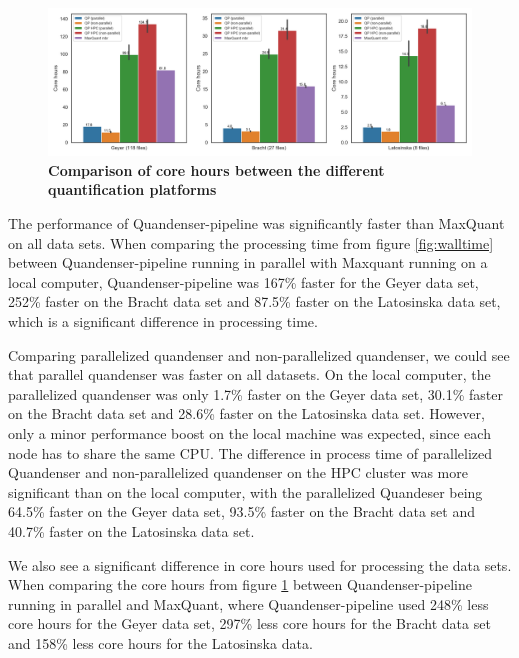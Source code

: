 \documentclass[11pt]{article}
\begin{document}
\begin{figure}[H]
  \includegraphics[width=\linewidth]{data/cores.png}
  \caption{\textbf{Comparison of core hours between the different quantification platforms}}
  \label{fig:corehours}
\end{figure}

The performance of Quandenser-pipeline was significantly faster than MaxQuant on all data sets. When comparing the processing time from figure \ref{fig:walltime} between Quandenser-pipeline running in parallel with Maxquant running on a local computer, Quandenser-pipeline was 167\% faster for the Geyer data set, 252\% faster on the Bracht data set and 87.5\% faster on the Latosinska data set, which is a significant difference in processing time.

Comparing parallelized quandenser and non-parallelized quandenser, we could see that parallel quandenser was faster on all datasets. On the local computer, the parallelized quandenser was only 1.7\% faster on the Geyer data set, 30.1\% faster on the Bracht data set and 28.6\% faster on the Latosinska data set. However, only a minor performance boost on the local machine was expected, since each node has to share the same CPU. The difference in process time of parallelized Quandenser and non-parallelized quandenser on the HPC cluster was more significant than on the local computer, with the parallelized Quandeser being 64.5\% faster on the Geyer data set, 93.5\% faster on the Bracht data set and 40.7\% faster on the Latosinska data set.

We also see a significant difference in core hours used for processing the data sets. When comparing the core hours from figure \ref{fig:corehours} between Quandenser-pipeline running in parallel and MaxQuant, where Quandenser-pipeline used 248\% less core hours for the Geyer data set, 297\% less core hours for the Bracht data set and 158\% less core hours for the Latosinska data.
\end{document}
